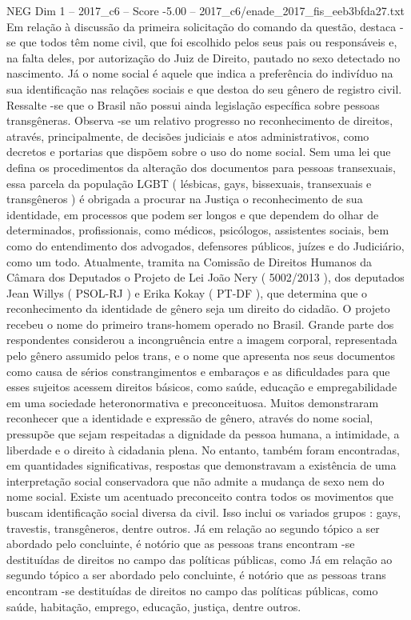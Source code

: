 \begin{textsample}{NEG Dim 1 – 2017\_c6 – Score -5.00 – 2017\_c6/enade\_2017\_fis\_eeb3bfda27.txt}
Em relação à discussão da primeira solicitação do comando da questão, destaca -se que todos têm nome civil, que foi escolhido pelos seus pais ou responsáveis e, na falta deles, por autorização do Juiz de Direito, pautado no sexo detectado no nascimento.
Já o nome social é aquele que indica a preferência do indivíduo na sua identificação nas relações sociais e que destoa do seu gênero de registro civil.
Ressalte -se que o Brasil não possui ainda legislação específica sobre pessoas transgêneras.
Observa -se um relativo progresso no reconhecimento de direitos, através, principalmente, de decisões judiciais e atos administrativos, como decretos e portarias que dispõem sobre o uso do nome social.
Sem uma lei que defina os procedimentos da alteração dos documentos para pessoas transexuais, essa parcela da população LGBT ( lésbicas, gays, bissexuais, transexuais e transgêneros ) é obrigada a procurar na Justiça o reconhecimento de sua identidade, em processos que podem ser longos e que dependem do olhar de determinados, profissionais, como médicos, psicólogos, assistentes sociais, bem como do entendimento dos advogados, defensores públicos, juízes e do Judiciário, como um todo.
Atualmente, tramita na Comissão de Direitos Humanos da Câmara dos Deputados o Projeto de Lei João Nery ( 5002/2013 ), dos deputados Jean Willys ( PSOL-RJ ) e Erika Kokay ( PT-DF ), que determina que o reconhecimento da identidade de gênero seja um direito do cidadão.
O projeto recebeu o nome do primeiro trans-homem operado no Brasil.
Grande parte dos respondentes considerou a incongruência entre a imagem corporal, representada pelo gênero assumido pelos trans, e o nome que apresenta nos seus documentos como causa de sérios constrangimentos e embaraços e as dificuldades para que esses sujeitos acessem direitos básicos, como saúde, educação e empregabilidade em uma sociedade heteronormativa e preconceituosa.
Muitos demonstraram reconhecer que a identidade e expressão de gênero, através do nome social, pressupõe que sejam respeitadas a dignidade da pessoa humana, a intimidade, a liberdade e o direito à cidadania plena.
No entanto, também foram encontradas, em quantidades significativas, respostas que demonstravam a existência de uma interpretação social conservadora que não admite a mudança de sexo nem do nome social.
Existe um acentuado preconceito contra todos os movimentos que buscam identificação social diversa da civil.
Isso inclui os variados grupos : gays, travestis, transgêneros, dentre outros.
Já em relação ao segundo tópico a ser abordado pelo concluinte, é notório que as pessoas trans encontram -se destituídas de direitos no campo das políticas públicas, como Já em relação ao segundo tópico a ser abordado pelo concluinte, é notório que as pessoas trans encontram -se destituídas de direitos no campo das políticas públicas, como saúde, habitação, emprego, educação, justiça, dentre outros.

\end{textsample}
